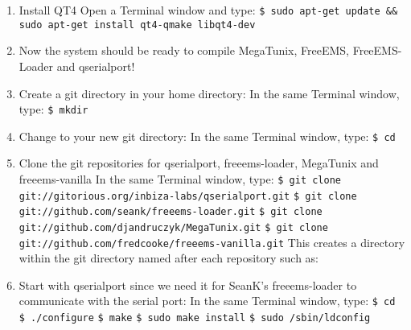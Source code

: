 \documentclass[12pt,notitlepage,onecolumn,oneside,openany]{memoir}
\begin{document}
\begin{enumerate}
\item \textsf{Install QT4} \newline
      \textsf{Open a Terminal window and type:} \newline
      \texttt{\$ sudo apt-get update \&\& sudo apt-get install qt4-qmake libqt4-dev}

\item \textsf{Now the system should be ready to compile MegaTunix, FreeEMS, FreeEMS-Loader and qserialport!}

\item \textsf{Create a git directory in your home directory:} \newline
      \textsf{In the same Terminal window, type:} \newline
      \texttt{\$ mkdir }

\item \textsf{Change to your new git directory:} \newline
      \textsf{In the same Terminal window, type:} \newline
      \texttt{\$ cd } 

\item \textsf{Clone the git repositories for qserialport, freeems-loader, MegaTunix and freeems-vanilla} \newline
      \textsf{In the same Terminal window, type:} \newline
      \texttt{\$ git clone git://gitorious.org/inbiza-labs/qserialport.git} \newline
      \texttt{\$ git clone git://github.com/seank/freeems-loader.git} \newline
      \texttt{\$ git clone git://github.com/djandruczyk/MegaTunix.git} \newline
      \texttt{\$ git clone git://github.com/fredcooke/freeems-vanilla.git} \newline
      \newline
      \textsf{This creates a directory within the git directory named after each repository such as:} \newline
       \newline	
       \newline
       \newline

\item \textsf{Start with qserialport since we need it for SeanK's freeems-loader to communicate with the serial port:} \newline
      \textsf{In the same Terminal window, type:} \newline
      \texttt{\$ cd }  \newline
      \texttt{\$ ./configure} \newline
      \texttt{\$ make} \newline
      \texttt{\$ sudo make install} \newline
      \texttt{\$ sudo /sbin/ldconfig} \newline
\end{enumerate}
\end{document}
